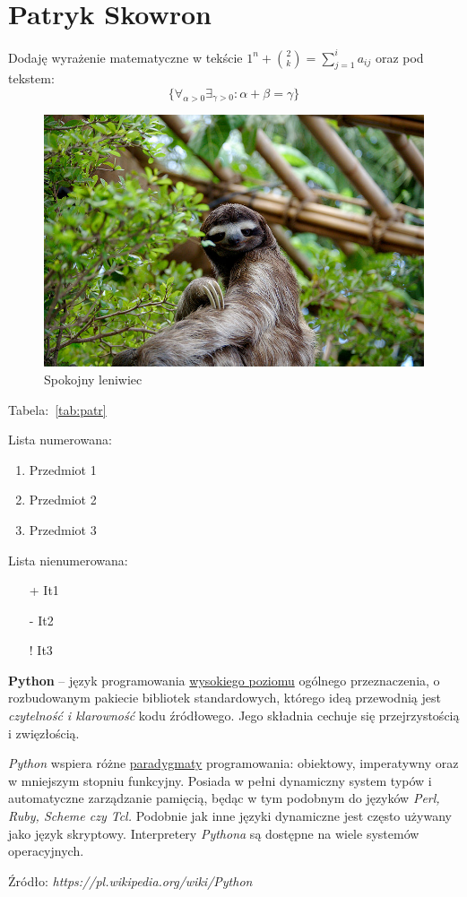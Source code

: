 \section{Patryk Skowron}

Dodaję wyrażenie matematyczne w tekście
$1^n+ {2 \choose k}=\sum_{j=1}^{i} a_{ij}$
oraz pod tekstem:
\[\{\forall_{\alpha>0} \exists_{\gamma>0} : \alpha+\beta=\gamma\}\]

\begin{figure}[htbp]
    \centering
    \includegraphics[scale=0.3]{pictures/leniwiec.jpg}
    \caption{Spokojny leniwiec}
    \label{fig:ln}
\end{figure}

Tabela:~\ref{tab:patr}


\newline

Lista numerowana:
\begin{enumerate}
    \item Przedmiot 1
    \item Przedmiot 2
    \item Przedmiot 3
\end{enumerate}

\newpage

Lista nienumerowana:
\begin{itemize}
    \item[+] It1
    \item[-] It2
    \item[!] It3
\end{itemize}

\textbf{Python} – język programowania \underline{wysokiego poziomu} ogólnego przeznaczenia, o rozbudowanym pakiecie bibliotek standardowych, którego ideą przewodnią jest \emph{czytelność i klarowność} kodu źródłowego. Jego składnia cechuje się przejrzystością i zwięzłością.

\textit{Python} wspiera różne \underline{paradygmaty} programowania: obiektowy, imperatywny oraz w mniejszym stopniu funkcyjny. Posiada w pełni dynamiczny system typów i automatyczne zarządzanie pamięcią, będąc w tym podobnym do języków \textit{Perl, Ruby, Scheme czy Tcl.} Podobnie jak inne języki dynamiczne jest często używany jako język skryptowy. Interpretery \emph{Pythona} są dostępne na wiele systemów operacyjnych.

Źródło: \emph{https://pl.wikipedia.org/wiki/Python}